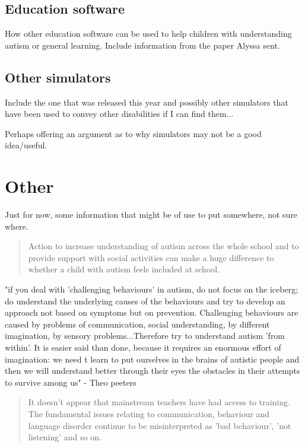 \documentclass[11pt]{report}
\begin{document}
\subsection{Education software}
How other education software can be used to help children with understanding autism or general learning. Include information from the paper Alyssa sent.

\subsection{Other simulators}
Include the one that was released this year and possibly other simulators that have been used to convey other disabilities if I can find them...

Perhaps offering an argument as to why simulators may not be a good idea/useful.

\section{Other}
Just for now, some information that might be of use to put somewhere, not sure where.

\begin{quote}
Action to increase understanding of autism across the whole school and to provide support with social activities can make a huge difference to whether a child with autism feels included at school.\cite{nasschool}
\end{quote}

"if you deal with 'challenging behaviours' in autism, do not focus on the iceberg; do understand the underlying causes of the behaviours and try to develop an approach not based on symptoms but on prevention. Challenging behaviours are caused by problems of communication, social understanding, by different imagination, by sensory problems...Therefore try to understand autism 'from within'. It is easier said than done, because it requires an enormous effort of imagination: we need t learn to put ourselves in the brains of autistic people and then we will understand better through their eyes the obstacles in their attempts to survive among us" - Theo peeters \cite{olgab}

\begin{quote}
It doesn't appear that mainstream teachers have had access to training. The fundamental issues relating to communication, behaviour and language disorder continue to be misinterpreted as 'bad behaviour', 'not listening' and so on.\cite{nasschool}
\end{quote}
\end{document}
